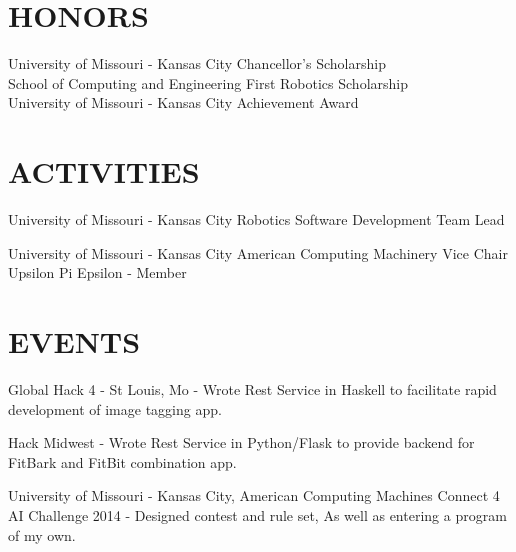 \documentclass[margin,11pt]{res} %
\begin{document}
\begin{resume}
 
 
\section{HONORS}         University of Missouri - Kansas City Chancellor's Scholarship \\
                School of Computing and Engineering First Robotics Scholarship \\
                University of Missouri - Kansas City Achievement Award \\
 
\section{ACTIVITIES}     University of Missouri - Kansas City Robotics Software Development Team Lead

				University of Missouri - Kansas City American Computing Machinery Vice Chair
                                Upsilon Pi Epsilon - Member
				
\section{EVENTS}
Global Hack 4 - St Louis, Mo - Wrote Rest Service in Haskell to facilitate rapid development of image tagging app.

Hack Midwest - Wrote Rest Service in Python/Flask to provide backend for FitBark and FitBit combination app.

University of Missouri -  Kansas City, American Computing Machines Connect 4 AI Challenge 2014 - Designed contest and rule set, As well as entering a program of my own.
				
                    

\end{resume} 
\end{document}

